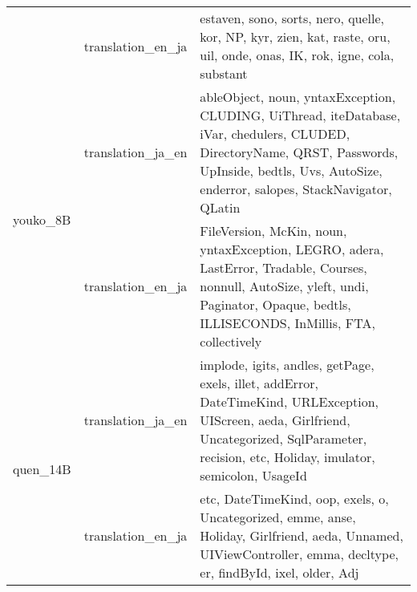 \begin{tabular}{lll}
 & translation_en_ja & estaven, sono, sorts, nero, quelle, kor, NP, kyr, zien, kat, raste, oru, uil, onde, onas, IK, rok, igne, cola, substant \\
\cline{1-3}
\multirow[t]{2}{*}{youko_8B} & translation_ja_en & ableObject, noun, yntaxException, CLUDING, UiThread, iteDatabase, iVar, chedulers, CLUDED, DirectoryName, QRST, Passwords, UpInside, bedtls, Uvs, AutoSize, enderror, salopes, StackNavigator, QLatin \\
 & translation_en_ja & FileVersion, McKin, noun, yntaxException, LEGRO, adera, LastError, Tradable, Courses, nonnull, AutoSize, yleft, undi, Paginator, Opaque, bedtls, ILLISECONDS, InMillis, FTA, collectively \\
\cline{1-3}
\multirow[t]{2}{*}{quen_14B} & translation_ja_en & implode, igits, andles, getPage, exels, illet, addError, DateTimeKind, URLException, UIScreen, aeda, Girlfriend, Uncategorized, SqlParameter, recision, etc, Holiday, imulator, semicolon, UsageId \\
 & translation_en_ja & etc, DateTimeKind, oop, exels, o, Uncategorized, emme, anse, Holiday, Girlfriend, aeda, Unnamed, UIViewController, emma, decltype, er, findById, ixel, older, Adj \\
\cline{1-3}
\bottomrule
\end{tabular}
